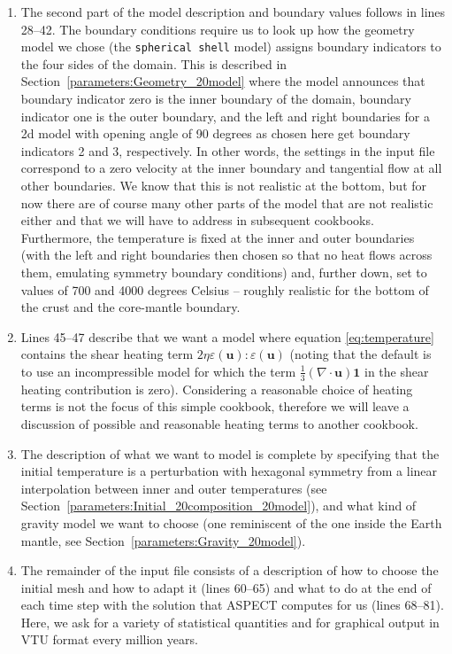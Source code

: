 \documentclass{article}
\newcommand{\aspect}{\textsc{ASPECT}}
\begin{document}
\begin{enumerate}
  \item The second part of the model description and boundary values follows in
  lines 28--42. The boundary conditions require us to look up how the geometry model
  we chose (the \texttt{spherical shell} model) assigns boundary indicators to
  the four sides of the domain. This is described in
  Section~\ref{parameters:Geometry_20model} where the model announces that
  boundary indicator zero is the inner boundary of the domain, boundary
  indicator one is the outer boundary, and the left and right boundaries for a
  2d model with opening angle of 90 degrees as chosen here get boundary
  indicators 2 and 3, respectively. In other words, the settings in the input
  file correspond to a zero velocity at the inner boundary and tangential flow
  at all other boundaries. We know that this is not realistic at the bottom, but
  for now there are of course many other parts of the model that are not
  realistic either and that we will have to address in subsequent cookbooks.
  Furthermore, the temperature is fixed at the inner and outer boundaries (with
  the left and right boundaries then chosen so that no heat flows across them,
  emulating symmetry boundary conditions) and, further down, set to values of
  700 and 4000 degrees Celsius -- roughly realistic for the bottom of the crust
  and the core-mantle boundary.

  \item Lines 45--47 describe that we want a model where equation
  \eqref{eq:temperature} contains the shear heating term $2\eta
  \varepsilon(\mathbf u):\varepsilon(\mathbf u)$ (noting that the default is to
  use an incompressible model for which the term $\frac{1}{3}(\nabla \cdot
  \mathbf u)\mathbf 1$ in the shear heating contribution is zero). Considering a
  reasonable choice of heating terms is not the focus of this simple cookbook,
  therefore we will leave a discussion of possible and reasonable heating terms
  to another cookbook.

  \item The description of what we want to model is complete by specifying
  that the initial temperature is a perturbation with hexagonal symmetry from a
  linear interpolation between inner and outer temperatures (see
  Section~\ref{parameters:Initial_20composition_20model}), and what kind of gravity model
  we want to choose (one reminiscent of the one inside the Earth mantle, see
  Section~\ref{parameters:Gravity_20model}).

  \item The remainder of the input file consists of a description of how to
  choose the initial mesh and how to adapt it (lines 60--65) and what to do at
  the end of each time step with the solution that \aspect{} computes for us (lines 68--81).
  Here, we ask for a variety of statistical quantities and for graphical output
  in VTU format every million years.
\end{enumerate}
\end{document}

